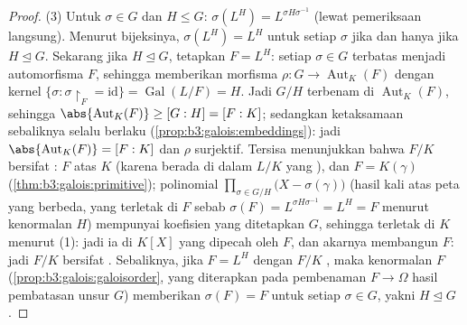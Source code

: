 \begin{proof}
(3) Untuk $\sigma \in G$ dan $H \leq G$: $\sigma(L^H) =
L^{\sigma H\sigma^{-1}}$ (lewat pemeriksaan langsung). Menurut bijeksinya,
$\sigma(L^H) = L^H$ untuk setiap $\sigma$ jika dan hanya jika $H \trianglelefteq G$.
Sekarang jika $H \trianglelefteq G$, tetapkan $F = L^H$: setiap $\sigma \in
G$ terbatas menjadi automorfisma $F$, sehingga memberikan morfisma $\rho
\colon G \to \operatorname{Aut}_K(F)$ dengan kernel $\{\sigma :
\sigma\restriction_F = \mathrm{id}\} = \operatorname{Gal}(L/F) =
H$. Jadi $G/H$ terbenam di $\operatorname{Aut}_K(F)$, sehingga
$\abs{\operatorname{Aut}_K(F)} \geq [G:H] = [F:K]$; sedangkan ketaksamaan
sebaliknya selalu berlaku (\cref{prop:b3:galois:embeddings}):
jadi $\abs{\operatorname{Aut}_K(F)} = [F:K]$ dan $\rho$ surjektif. Tersisa
menunjukkan bahwa $F/K$ bersifat : $F$  atas $K$
(karena berada di dalam $L/K$ yang ), dan $F = K(\gamma)$
(\cref{thm:b3:galois:primitive}); polinomial
$\prod_{\sigma \in G/H}\bigl(X - \sigma(\gamma)\bigr)$ (hasil kali
atas peta yang berbeda, yang terletak di $F$ sebab $\sigma(F) =
L^{\sigma H\sigma^{-1}} = L^H = F$ menurut kenormalan $H$) mempunyai
koefisien
yang ditetapkan $G$, sehingga terletak di $K$ menurut (1): jadi ia 
di $K[X]$ yang dipecah oleh $F$, dan akarnya membangun $F$: jadi $F/K$ bersifat
. Sebaliknya, jika $F = L^H$ dengan $F/K$ , maka kenormalan
$F$ (\cref{prop:b3:galois:galoisorder}, yang diterapkan pada pembenaman
$F \to \Omega$ hasil pembatasan unsur $G$) memberikan
$\sigma(F) = F$ untuk setiap $\sigma \in G$, yakni $H
\trianglelefteq G$.
\end{proof}

